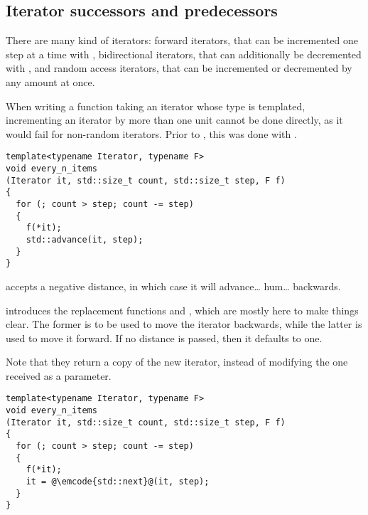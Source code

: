 \subsection{Iterator successors and predecessors}

There are many kind of iterators: forward iterators, that can be
incremented one step at a time with , bidirectional
iterators, that can additionally be decremented with
, and random access iterators, that can be
incremented or decremented by any amount at once.

When writing a function taking an iterator whose type is templated,
incrementing an iterator by more than one unit cannot be done
directly, as it would fail for non-random iterators. Prior to ,
this was done with .

\begin{lstlisting}
template<typename Iterator, typename F>
void every_n_items
(Iterator it, std::size_t count, std::size_t step, F f)
{
  for (; count > step; count -= step)
  {
    f(*it);
    std::advance(it, step);
  }
}
\end{lstlisting}

 accepts a negative distance, in which case it
will advance… hum… backwards.

 introduces the replacement functions  and
, which are mostly here to make things clear. The
former is to be used to move the iterator backwards, while the latter
is used to move it forward. If no distance is passed, then it defaults
to one.

Note that they return a copy of the new iterator, instead of modifying
the one received as a parameter.

\begin{lstlisting}
template<typename Iterator, typename F>
void every_n_items
(Iterator it, std::size_t count, std::size_t step, F f)
{
  for (; count > step; count -= step)
  {
    f(*it);
    it = @\emcode{std::next}@(it, step);
  }
}
\end{lstlisting}
